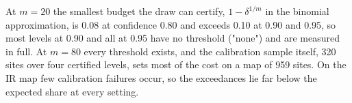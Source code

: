 \documentclass{iopjournal}
\begin{document}
At \(m = 20\) the smallest budget the draw can certify, \(1 - \delta^{1/m}\) in the binomial approximation, is 0.08 at confidence 0.80 and exceeds 0.10 at 0.90 and 0.95, so most levels at 0.90 and all at 0.95 have no threshold ("none") and are measured in full. At \(m = 80\) every threshold exists, and the calibration sample itself, 320 sites over four certified levels, sets most of the cost on a map of 959 sites. On the IR map few calibration failures occur, so the exceedances lie far below the expected share at every setting.



\end{document}
